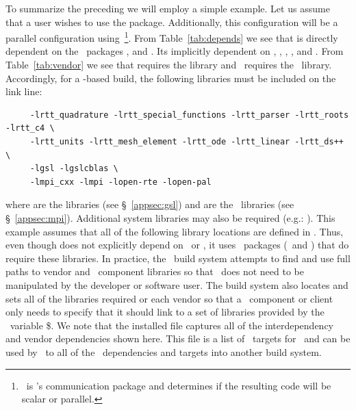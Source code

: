 To summarize the preceding we will employ a simple example.  Let us
assume that a user wishes to use the  package.  Additionally,
this configuration will be a parallel configuration using
\mpi\,\footnote{\cfour\ is \draco's communication package and
  determines if the resulting code will be scalar or parallel.}.  From
Table~\ref{tab:depends} we see that  is directly dependent on the \draco\ 
packages ,  and .  Its implicitly dependent on , \dsxx, , ,  and \cfour.  From Table~\ref{tab:vendor} we see
that \pkg{special\_functions} requires the \sys{GSL} library and \cfour\ requires the \mpi\ 
library.  Accordingly, for a \sys{UNIX} \sys{Makefile}-based build, the following libraries must be included on the
link line:
\begin{verbatim}
     -lrtt_quadrature -lrtt_special_functions -lrtt_parser -lrtt_roots -lrtt_c4 \
     -lrtt_units -lrtt_mesh_element -lrtt_ode -lrtt_linear -lrtt_ds++ \
     -lgsl -lgslcblas \
     -lmpi_cxx -lmpi -lopen-rte -lopen-pal
\end{verbatim}
where \comp{-lgsl -lgslcblas} are the \pkg{GSL} libraries (see \S~\ref{appsec:gsl}) and  are the \mpi\ libraries (see \S~\ref{appsec:mpi}).  Additional system libraries may also be required (e.g.: ).
This example assumes that all of the following library locations are
defined in \ldlib.  Thus, even though  does not explicitly depend
on \mpi\ or \sys{GSL}, it uses \draco\ packages (\cfour\ and ) that
do require these libraries.  In practice, the \draco\ build system attempts to find and use full paths to vendor and \draco\ component libraries so that \ldlib\ does not need to be manipulated by the developer or software user.  The build system also locates and sets all of the libraries required or each vendor so that a \draco\ component or client only needs to specify that it should link to a set of libraries provided by the \cmake\ variable  \$.  We note that the installed file  captures all of the interdependency and vendor dependencies shown here.  This file is a list of  \cmake\ targets for \draco\ and can be used by \cmake\ to  all of the \draco\ dependencies and targets into another build system.


